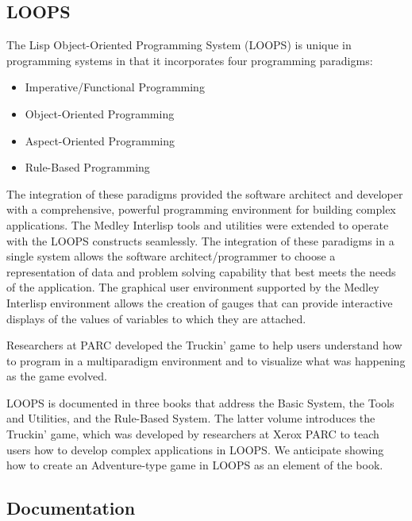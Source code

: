 \documentclass[sigconf]{acmart}
\begin{document}
\subsection{LOOPS}

The Lisp Object-Oriented Programming System (LOOPS) is unique in programming systems in that it incorporates four programming paradigms:

\begin{itemize}
  \item Imperative/Functional Programming
  \item Object-Oriented Programming
  \item Aspect-Oriented Programming
  \item Rule-Based Programming
\end{itemize}
    
The integration of these paradigms provided the software architect and developer with a comprehensive, powerful programming environment for building complex applications\cite{Bobrow83}. The Medley Interlisp tools and utilities were extended to operate with the LOOPS constructs seamlessly. The integration of these paradigms in a single system allows the software architect/programmer to choose a representation of data and problem solving capability that best meets the needs of the application. The graphical user environment supported by the Medley Interlisp environment allows the creation of gauges that can provide interactive displays of the values of variables to which they are attached.

Researchers at PARC developed the Truckin' game to help users understand how to program in a multiparadigm environment and to visualize what was happening as the game evolved\cite{Stefik83}.

LOOPS is documented in three books that address the Basic System, the Tools and Utilities, and the Rule-Based System. The latter volume introduces the Truckin' game\cite{Stefik00}, which was developed by researchers at Xerox PARC to teach users how to develop complex applications in LOOPS. We anticipate showing how to create an Adventure-type game in LOOPS as an element of the book.


\subsection{Documentation}
\end{document}
